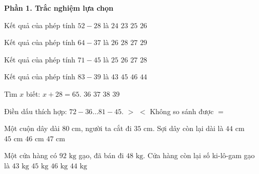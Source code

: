 \textbf{Phần 1. Trắc nghiệm lựa chọn}

\begin{ex} %
Kết quả của phép tính $52 - 28$ là
\choice
{\True $24$}
{$23$}
{$25$}
{$26$}
\end{ex}

\begin{ex} %
Kết quả của phép tính $64 - 37$ là
\choice
{$26$}
{$28$}
{\True $27$}
{$29$}
\end{ex}

\begin{ex} %
Kết quả của phép tính $71 - 45$ là
\choice
{$25$}
{\True $26$}
{$27$}
{$28$}
\end{ex}

\begin{ex} %
Kết quả của phép tính $83 - 39$ là
\choice
{$43$}
{$45$}
{$46$}
{\True $44$}
\end{ex}

\begin{ex} %
Tìm $x$ biết: $x + 28 = 65$.
\choice
{$36$}
{\True $37$}
{$38$}
{$39$}
\end{ex}

\begin{ex} %
Điền dấu thích hợp: $72 - 36 \dots 81 - 45$.
\choice
{$>$}
{$<$}
{Không so sánh được}
{\True $=$}
\end{ex}

\begin{ex} %
Một cuộn dây dài $80\text{ cm}$, người ta cắt đi $35\text{ cm}$. Sợi dây còn lại dài là
\choice
{$44\text{ cm}$}
{\True $45\text{ cm}$}
{$46\text{ cm}$}
{$47\text{ cm}$}
\end{ex}

\begin{ex} %
Một cửa hàng có $92\text{ kg}$ gạo, đã bán đi $48\text{ kg}$. Cửa hàng còn lại số ki-lô-gam gạo là
\choice
{$43\text{ kg}$}
{$45\text{ kg}$}
{$46\text{ kg}$}
{\True $44\text{ kg}$}
\end{ex}

